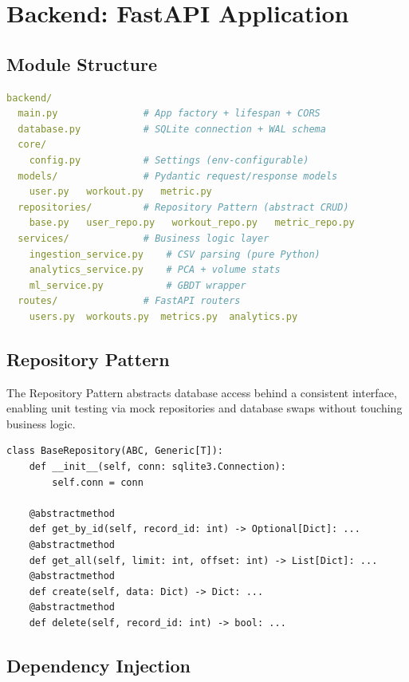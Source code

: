 \documentclass[12pt,a4paper]{report}
\begin{document}
\section{Backend: FastAPI Application}

\subsection{Module Structure}

\begin{lstlisting}[language=yaml,caption=Backend module layout]
backend/
  main.py               # App factory + lifespan + CORS
  database.py           # SQLite connection + WAL schema
  core/
    config.py           # Settings (env-configurable)
  models/               # Pydantic request/response models
    user.py   workout.py   metric.py
  repositories/         # Repository Pattern (abstract CRUD)
    base.py   user_repo.py   workout_repo.py   metric_repo.py
  services/             # Business logic layer
    ingestion_service.py    # CSV parsing (pure Python)
    analytics_service.py    # PCA + volume stats
    ml_service.py           # GBDT wrapper
  routes/               # FastAPI routers
    users.py  workouts.py  metrics.py  analytics.py
\end{lstlisting}

\subsection{Repository Pattern}

The Repository Pattern abstracts database access behind a consistent interface,
enabling unit testing via mock repositories and database swaps without touching
business logic.

\begin{lstlisting}[caption=Abstract BaseRepository]
class BaseRepository(ABC, Generic[T]):
    def __init__(self, conn: sqlite3.Connection):
        self.conn = conn

    @abstractmethod
    def get_by_id(self, record_id: int) -> Optional[Dict]: ...
    @abstractmethod
    def get_all(self, limit: int, offset: int) -> List[Dict]: ...
    @abstractmethod
    def create(self, data: Dict) -> Dict: ...
    @abstractmethod
    def delete(self, record_id: int) -> bool: ...
\end{lstlisting}

\subsection{Dependency Injection}
\end{document}
